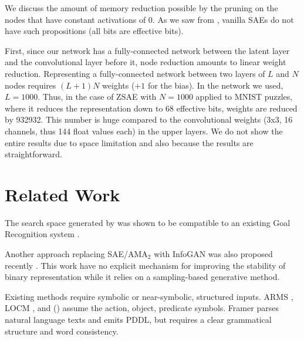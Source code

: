 We discuss the amount of memory reduction possible by the pruning on the nodes
that have constant activations of 0. As we saw from ,
vanilla SAEs do not have such propositions (all bits are effective bits).

First, since our network has a fully-connected network between the
latent layer and the convolutional layer before it, node reduction
amounts to linear weight reduction.  Representing a fully-connected
network between two layers of $L$ and $N$ nodes requires $(L+1)N$
weights ($+1$ for the bias).
In the network we used, $L=1000$. Thus, in the case of ZSAE with $N=1000$ applied to MNIST puzzles,
where it reduces the representation down to 68 effective bits, weights are reduced by 932932.
This number is huge compared to the convolutional weights (3x3, 16 channels, thus 144 float values each) in the upper layers.
We do not show the entire results due to space limitation and also because the results are straightforward.


\section{Related Work}

The search space generated by \latentplanner was shown to be compatible
to an existing Goal Recognition system \cite{amado2018goal}.

Another approach replacing SAE/AMA$_2$ with InfoGAN was also proposed recently \cite{kurutach2018learning}.
This work have no explicit mechanism for improving the stability of binary representation
while it relies on a sampling-based generative method.


Existing methods require symbolic
or near-symbolic, structured inputs. ARMS \cite{YangWJ07}, LOCM
\cite{CresswellMW13}, and \citeauthor{MouraoZPS12} (\citeyear{MouraoZPS12})
assume the action, object, predicate symbols.
% 
Framer \cite{lindsay2017framer} parses natural language texts and emits PDDL,
but requires a clear grammatical structure and word consistency. %

